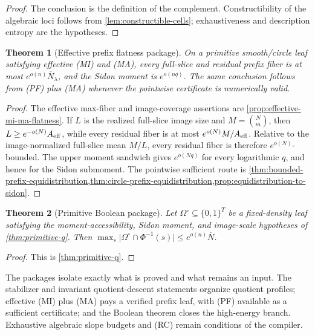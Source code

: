 \documentclass[12pt,a4paper]{amsart}
\numberwithin{equation}{section}
\newtheorem{theorem}{Theorem}[section]
\theoremstyle{remark}
\newcommand{\Omc}{\Omega^{\circ}}
\newcommand{\barN}{\overline N}
\newcommand{\abs}[1]{\lvert #1\rvert}
\begin{document}
\begin{proof}
The conclusion is the definition of the complement.  Constructibility of
the algebraic loci follows from \cref{lem:constructible-cells};
exhaustiveness and description entropy are the hypotheses.
\end{proof}

\begin{theorem}[Effective prefix flatness package]\label{thm:prefix-flatness-package}
On a primitive smooth/circle leaf satisfying effective \textup{(MI)} and
\textup{(MA)}, every full-slice and residual prefix fiber is at most
\(e^{o(n)}\barN_\lambda\), and the Sidon moment is
\(e^{o(nq)}\).  The same conclusion follows from \textup{(PF)} plus
\textup{(MA)} whenever the pointwise certificate is numerically valid.
\end{theorem}

\begin{proof}
The effective max-fiber and image-coverage assertions are
\cref{prop:effective-mi-ma-flatness}.  If \(L\) is the realized
full-slice image size and \(M=\binom Nm\), then
\(L\ge e^{-o(N)}A_{\rm eff}\), while every residual fiber is at most
\(e^{o(N)}M/A_{\rm eff}\).  Relative to the image-normalized full-slice
mean \(M/L\), every residual fiber is therefore \(e^{o(N)}\)-bounded.
The upper moment sandwich gives \(e^{o(Nq)}\) for every logarithmic
\(q\), and hence for the Sidon submoment.  The pointwise sufficient route is
\cref{thm:bounded-prefix-equidistribution,thm:circle-prefix-equidistribution,prop:equidistribution-to-sidon}.
\end{proof}

\begin{theorem}[Primitive Boolean package]\label{thm:boolean-package}
Let \(\Omc\subseteq\{0,1\}^T\) be a fixed-density leaf satisfying the
moment-accessibility, Sidon moment, and image-scale hypotheses of
\cref{thm:primitive-q}.  Then
\(\max_s\abs{\Omc\cap\Phi^{-1}(s)}\le e^{o(n)}\barN\).
\end{theorem}

\begin{proof}
This is \cref{thm:primitive-q}.
\end{proof}

The packages isolate exactly what is proved and what remains an input.  The
stabilizer and invariant quotient-descent statements organize quotient profiles;
effective \textup{(MI)} plus \textup{(MA)} pays a verified prefix leaf,
with \textup{(PF)} available as a sufficient certificate; and the
Boolean theorem closes the high-energy branch.  Exhaustive algebraic slope
budgets and \textup{(RC)} remain conditions of the compiler.
\end{document}
